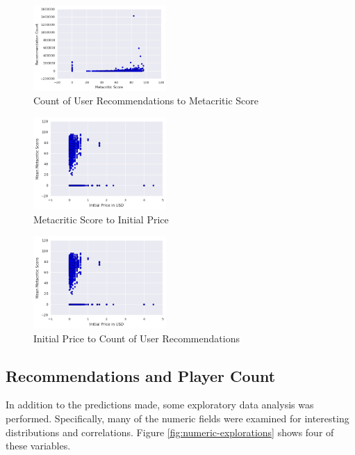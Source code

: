 \documentclass[letterpaper,10pt,twocolumn]{article}
\begin{document}
\begin{figure}[h]
    \caption{Count of User Recommendations to Metacritic Score}
    \label{fig:metacritic-recommendations}
    \includegraphics[width=0.45\textwidth,keepaspectratio]{metacritic-recommendations-scatter}
\end{figure}

\begin{figure}[h]
    \caption{Metacritic Score to Initial Price}
    \label{fig:metacritic-price}
    \includegraphics[width=0.45\textwidth,keepaspectratio]{price-metacritic-scatter}
\end{figure}

\begin{figure}[h]
    \caption{Initial Price to Count of User Recommendations}
    \label{fig:price-recommendations}
    \includegraphics[width=0.45\textwidth,keepaspectratio]{price-metacritic-scatter}
\end{figure}

\subsection{Recommendations and Player Count}

In addition to the predictions made, some exploratory data analysis was performed.
Specifically, many of the numeric fields were examined for interesting distributions
and correlations. Figure \ref{fig:numeric-explorations} shows four of these variables.
\end{document}
